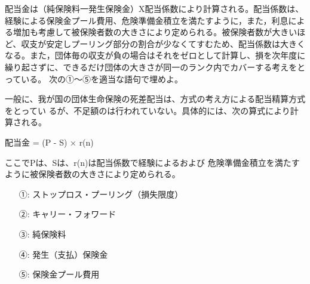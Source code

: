 \documentclass[report,gutter=10mm,fore-edge=10mm,uplatex,dvipdfmx]{jlreq}
\begin{document}
配当金は（純保険料一発生保険金）X配当係数により計算される。配当係数は、
経験による保険金プール費用、危険準備金積立を満たすように，また，利息によ
る増加も考慮して被保険者数の大きさにより定められる。被保険者数が大きいほ
ど、収支が安定しプーリング部分の割合が少なくてすむため、配当係数は大きく
なる。また，団体毎の収支が負の場合はそれをゼロとして計算し、損を次年度に
繰り起さずに、できるだけ団体の大きさが同一のランク内でカバーする考えをと
っている。
次の①～⑤を適当な語句で埋めよ。

一般に、我が国の団体生命保険の死差配当は、方式の考え方による配当精算方式をとってい
るが、不足額のは行われていない。具体的には、次の算式により計算される。

配当金 = (P - S) × r(n)

ここでPは、Sは、r(n)は配当係数で経験によるおよび
危険準備金積立を満たすように被保険者数の大きさにより定められる。

\answer{}

\begin{itemize}
\item[ ①: ] ストップロス・プーリング（損失限度）
\item[ ②: ] キャリー・フォワード
\item[ ③: ] 純保険料
\item[ ④: ] 発生（支払）保険金
\item[ ⑤: ] 保険金プール費用
\end{itemize}
\end{document}
